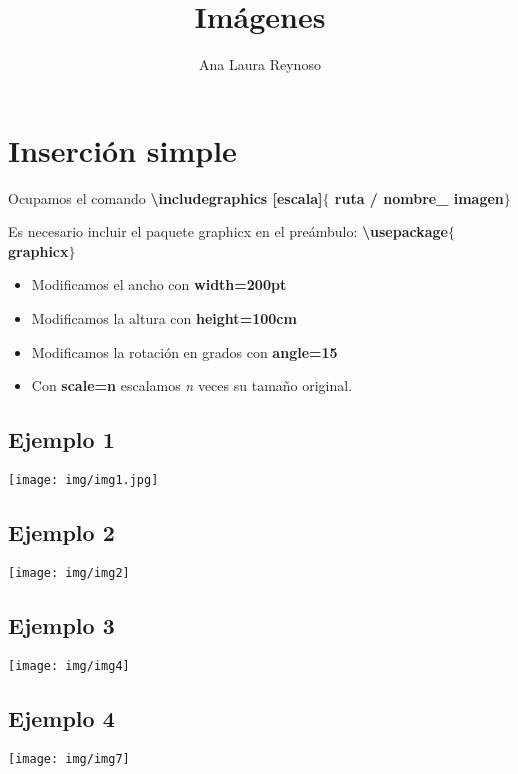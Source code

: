 \documentclass[11pt,letterpaper]{article}
\author{Ana Laura Reynoso}
\title{Imágenes}
\begin{document}
	\maketitle

	\section{Inserción simple}
	Ocupamos el comando \textbf{\textbackslash includegraphics [escala]$\lbrace$ ruta / nombre\_ imagen$\rbrace$} 
	
	Es necesario incluir el paquete graphicx en el preámbulo: \textbf{\textbackslash usepackage$\lbrace$graphicx$\rbrace$}
	
	\begin{itemize}
		\item Modificamos el ancho con \textbf{width=200pt}
		\item Modificamos la altura con \textbf{height=100cm}
		\item Modificamos la rotación en grados con \textbf{angle=15}
		\item Con \textbf{scale=n} escalamos \textit{n} veces su tamaño original.  
	\end{itemize}
	
	\subsection{Ejemplo 1}
	\texttt{[image: img/img1.jpg]} %
	
	\subsection{Ejemplo 2}
	\texttt{[image: img/img2]} %
	
	\subsection{Ejemplo 3}
	\texttt{[image: img/img4]} %
	
	\subsection{Ejemplo 4}
	
	\texttt{[image: img/img7]} %
	
	
	\newpage
\end{document}
